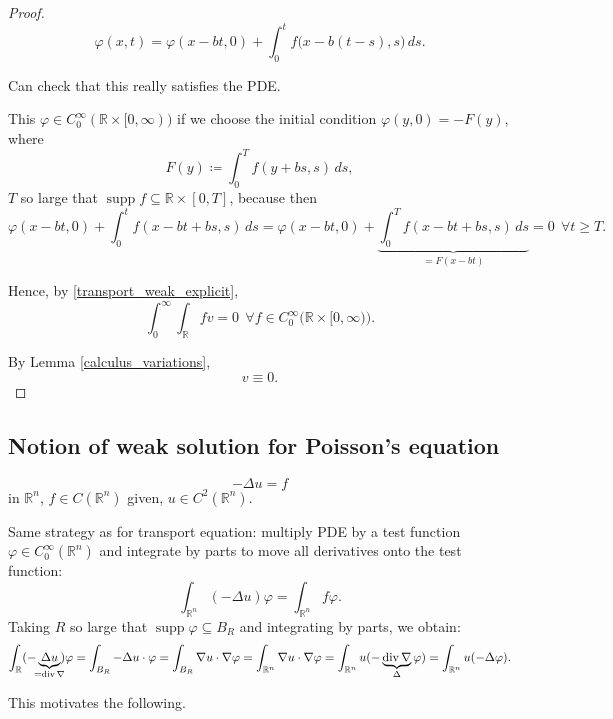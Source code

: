 \documentclass[12pt]{article}
\DeclareMathOperator{\diver}{div}
\DeclareMathOperator{\supp}{supp}
\theoremstyle{definition}
\begin{document}
\begin{proof}
\[\varphi(x,t)=\varphi(x-bt,0)+\int_0^tf\big(x-b(t-s),s\big)\,ds.\]

Can check that this really satisfies the PDE.

This $\varphi\in C_0^{\infty}(\mathbb{R}\times[0,\infty))$ if we choose the initial condition $\varphi(y,0)=-F(y)$, where
\[F(y)\coloneqq\int_0^Tf(y+bs,s)\,ds,\]
$T$ so large that $\supp f\subseteq\mathbb{R}\times[0,T]$, because then
\[\varphi(x-bt,0)+\int_0^tf(x-bt+bs,s)\,ds=\varphi(x-bt,0)+\underbrace{\int_0^Tf(x-bt+bs,s)\,ds}_{=F(x-bt)}=0\ \ \forall t\geq T.\]

Hence, by \eqref{transport_weak_explicit},
\[\int_0^{\infty}\int_{\mathbb{R}}fv=0 \ \ \forall f\in C_0^{\infty}\big(\mathbb{R}\times[0,\infty)\big).\]

By Lemma \ref{calculus_variations},
\[v\equiv0.\]
\end{proof}

\subsection*{Notion of weak solution for Poisson's equation}
\begin{equation}\tag{P}\label{Poisson_future_weak}
-\Delta u=f
\end{equation}
in $\mathbb{R}^n$, $f\in C(\mathbb{R}^n)$ given, $u\in C^2(\mathbb{R}^n)$.

Same strategy as for transport equation: multiply PDE by a test function $\varphi\in C_0^{\infty}(\mathbb{R}^n)$ and integrate by parts to move all derivatives onto the test function:
\[\int_{\mathbb{R}^n}(-\Delta u)\varphi=\int_{\mathbb{R}^n}f\varphi.\]
Taking $R$ so large that $\supp\varphi\subseteq B_R$ and integrating by parts, we obtain:
\[\int_{\mathbb{R}}(-\underbrace{\Delta u}_{\mathclap{=\diver\nabla}})\varphi=\int_{B_R}-\Delta u\cdot\varphi=\int_{B_R}\nabla u\cdot\nabla\varphi=\int_{\mathbb{R}^n}\nabla u\cdot\nabla\varphi=\int_{\mathbb{R}^n}u(-\underbrace{\diver\nabla}_{\Delta}\varphi)=\int_{\mathbb{R}^n}u(-\Delta\varphi).\]

This motivates the following.
\end{document}
